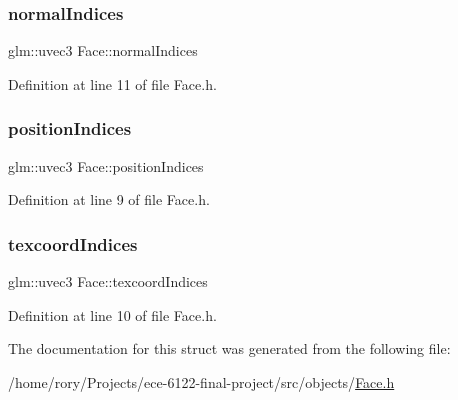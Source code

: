 \subsubsection{\texorpdfstring{normal\+Indices}{normalIndices}}
{\footnotesize\ttfamily glm\+::uvec3 Face\+::normal\+Indices}



Definition at line 11 of file Face.\+h.

\mbox{\label{struct_face_a5d796c13d0c71d4d5745ae0597380037}} 
\subsubsection{\texorpdfstring{position\+Indices}{positionIndices}}
{\footnotesize\ttfamily glm\+::uvec3 Face\+::position\+Indices}



Definition at line 9 of file Face.\+h.

\mbox{\label{struct_face_abf7b5c4f1771b6ea979d1f38b107c0cf}} 
\subsubsection{\texorpdfstring{texcoord\+Indices}{texcoordIndices}}
{\footnotesize\ttfamily glm\+::uvec3 Face\+::texcoord\+Indices}



Definition at line 10 of file Face.\+h.



The documentation for this struct was generated from the following file\+:\begin{DoxyCompactItemize}
\item 
/home/rory/\+Projects/ece-\/6122-\/final-\/project/src/objects/\hyperlink{_face_8h}{Face.\+h}\end{DoxyCompactItemize}
